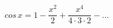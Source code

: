 \documentclass[12pt]{article}
\begin{document}
\sicpsize
\[
cos \, x = 1 - \frac{x^2}{2} + \frac{x^4}{4 \cdot 3 \cdot 2} - \dots
\]
\end{document}
